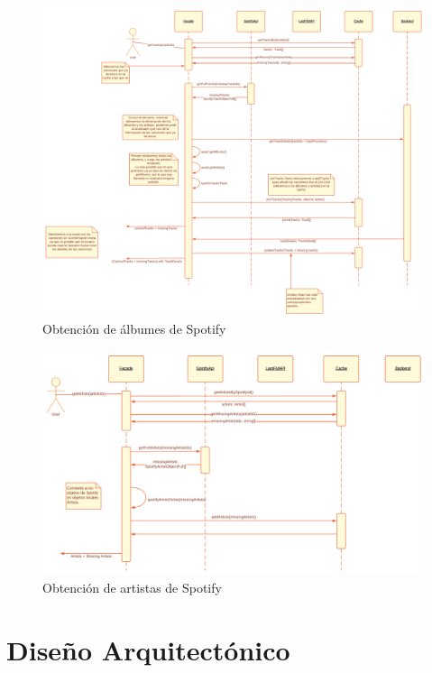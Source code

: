 \begin{figure}
    \centering
    \includegraphics[angle=90]{img/C/track_fetch.png}
    \caption{Obtención de álbumes de Spotify}
    \label{fig:C:album_fetch}
\end{figure}

\begin{figure}
    \centering
    \includegraphics[angle=90]{img/C/artist_fetch.png}
    \caption{Obtención de artistas de Spotify}
    \label{fig:C:artist_fetch}
\end{figure}

\clearpage

\section{Diseño Arquitectónico}

